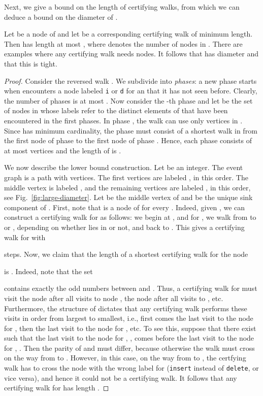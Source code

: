 \documentclass[oribibl,envcountsect,envcountsame]{llncs}
\begin{document}
Next, we give a bound on the length of certifying walks, from
which we can deduce a bound on the diameter of .
\begin{theorem}
Let  be a node of  and let  be a corresponding certifying walk 
of minimum length. Then  has length at most , where  denotes 
the number of nodes in . There are examples where any certifying walk
needs  nodes. It follows that  has diameter 
and that this is tight.
\end{theorem}

\begin{proof}
Consider the reversed walk . We subdivide  into \emph{phases}: 
a new phase starts when  encounters a node labeled 
\texttt{i} or \texttt{d} for an  that it has not seen 
before. Clearly, the number of phases is at most . 
Now consider the -th phase and let  be the set of nodes in  
whose labels refer to the  distinct elements of  that have been
encountered in the first  phases. In phase , the walk  
can use only vertices in . Since  has minimum cardinality, 
the phase must consist of a shortest walk in  from the first node of
phase  to the first node of phase .
Hence, each phase consists of at most  vertices and
the length of  is .

We now describe the lower bound construction. 
Let  be an integer.
The event graph   is a path with  vertices. The first  
vertices are labeled
, in this order. 
The middle vertex is labeled , and the remaining 
 vertices are labeled , in this
order, see Fig.~\ref{fig:large-diameter}. 
Let  be the middle vertex of  and
 be the unique sink component of .
First, note that  is a node of  for every 
. Indeed, given ,
we can construct a certifying walk for  as follows:
we begin at , and for , we walk from  to
 or , depending on whether  lies in  or 
not, and back to . This gives a certifying walk for   with 

steps. 
Now, we claim that the length of a shortest certifying walk for the node 

is . Indeed, note that the set 
 
contains exactly the odd numbers between  and . Thus, a certifying 
walk for  must visit the node  after all visits to
node , the node  after all visits to 
, etc. Furthermore, the structure of  dictates that 
any certifying walk performs these visits in order from largest 
to smallest, i.e., first comes the last visit to the node for
, then the last visit to the node for , etc. 
To see this, suppose that there exist 
such that the last visit to the node for , , comes before 
the last visit to the node for , . Then the parity of  
and  must differ, because otherwise the walk must cross  
on the way from  to . However, in this case, on the way 
from  to , the certfying walk has to cross the node with the 
wrong label for  (\texttt{insert} instead of \texttt{delete}, or vice 
versa), and hence it could not be a certifying walk. It follows 
that any certifying walk for  has length .


\end{proof}
\end{document}
